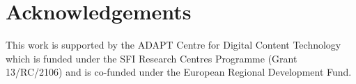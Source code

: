 \chapter*{Acknowledgements}
This work is supported by the ADAPT Centre for Digital Content Technology which is funded under the SFI Research Centres Programme (Grant 13/RC/2106) and is co-funded under the European Regional Development Fund.

